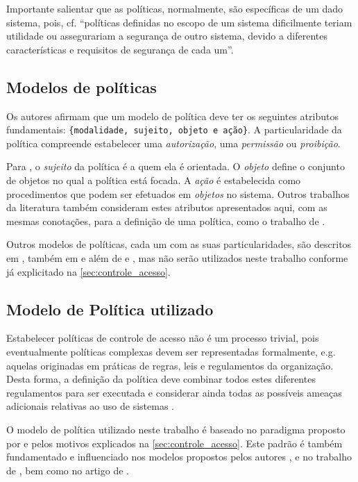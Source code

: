 Importante salientar que as políticas, normalmente, são específicas de um dado sistema, pois, cf.  ``políticas definidas no escopo de um sistema dificilmente teriam utilidade ou assegurariam a segurança de outro sistema, devido a diferentes características e requisitos de segurança de cada um''.

\subsection{Modelos de políticas}\label{modelo_politicas}
Os autores  afirmam que um modelo de política deve ter os seguintes atributos fundamentais: \verb|{modalidade, sujeito, objeto e ação}|. A particularidade da política compreende estabelecer uma \textit{autorização}, uma \textit{permissão} ou \textit{proibição}. 

Para , o \textit{sujeito }da política é a quem ela é orientada. O \textit{objeto} define o conjunto de objetos no qual a política está focada. A \textit{ação} é estabelecida como procedimentos que podem ser efetuados em \textit{objetos} no sistema. Outros trabalhos da literatura também consideram estes atributos apresentados aqui, com as mesmas conotações, para a definição de uma política, como o trabalho de  .

Outros modelos de políticas, cada um com as suas particularidades, são descritos em , também em  e  além de  e , mas não serão utilizados neste trabalho conforme já explicitado na \autoref{sec:controle_acesso}.

\subsection{Modelo de Política utilizado}\label{modelo_politica_utilizada}
Estabelecer políticas de controle de acesso não é um processo trivial, pois eventualmente políticas complexas devem ser representadas formalmente, e.g. aquelas originadas em práticas de regras, leis e regulamentos da organização. Desta forma, a definição da política deve combinar todos estes diferentes regulamentos para ser executada e considerar ainda todas as possíveis ameaças adicionais relativas ao uso de sistemas \cite{di_vimercati_policies_2005}.

O modelo de política utilizado neste trabalho é baseado no paradigma proposto por  e  pelos motivos explicados na \autoref{sec:controle_acesso}. Este padrão é também fundamentado e influenciado nos modelos propostos pelos autores , e no trabalho de , bem como no artigo de .

